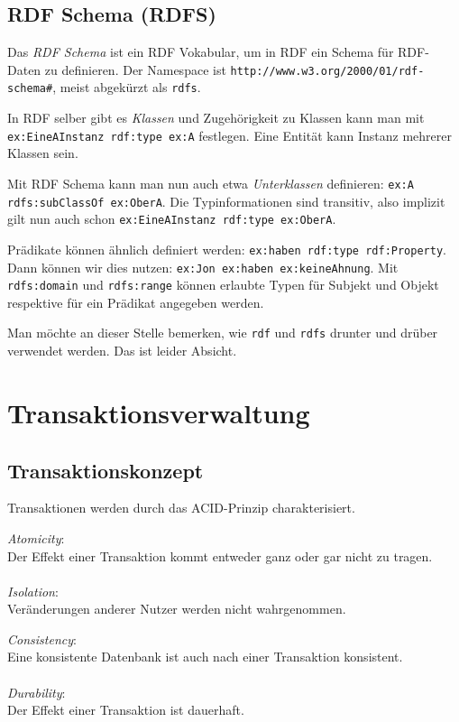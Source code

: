 \documentclass[a4paper,parskip=half*,DIV=15,fontsize=11pt]{scrartcl}
\begin{document}
\subsection{RDF Schema (RDFS)}

Das \emph{RDF Schema} ist ein RDF Vokabular, um in RDF ein Schema für RDF-Daten zu definieren. Der Namespace ist \lstinline{http://www.w3.org/2000/01/rdf-schema#}, meist abgekürzt als \lstinline{rdfs}.

In RDF selber gibt es \emph{Klassen} und Zugehörigkeit zu Klassen kann man mit \lstinline{ex:EineAInstanz rdf:type ex:A} festlegen. Eine Entität kann Instanz mehrerer Klassen sein.

Mit RDF Schema kann man nun auch etwa \emph{Unterklassen} definieren: \lstinline{ex:A rdfs:subClassOf ex:OberA}. Die Typinformationen sind transitiv, also implizit gilt nun auch schon \lstinline{ex:EineAInstanz rdf:type ex:OberA}.

Prädikate können ähnlich definiert werden: \lstinline{ex:haben rdf:type rdf:Property}. Dann können wir dies nutzen: \lstinline{ex:Jon ex:haben ex:keineAhnung}. Mit \lstinline{rdfs:domain} und \lstinline{rdfs:range} können erlaubte Typen für Subjekt und Objekt respektive für ein Prädikat angegeben werden.

Man möchte an dieser Stelle bemerken, wie \lstinline{rdf} und \lstinline{rdfs} drunter und drüber verwendet werden. Das ist leider Absicht.
\pagebreak
\section{Transaktionsverwaltung}
\subsection{Transaktionskonzept}
Transaktionen werden durch das ACID-Prinzip  charakterisiert.

\begin{minipage}[t]{0.45\textwidth}
\emph{Atomicity}: \\
Der Effekt einer Transaktion kommt entweder ganz oder gar nicht zu tragen.\\
\ \\
\emph{Isolation}: \\
Veränderungen anderer Nutzer werden nicht wahrgenommen.
\end{minipage}
\hspace{0.10\textwidth}
\begin{minipage}[t]{0.45\textwidth}
\emph{Consistency}: \\
Eine konsistente Datenbank ist auch nach einer Transaktion konsistent. \\
\ \\
\emph{Durability}: \\
Der Effekt einer Transaktion ist dauerhaft.
\end{minipage} \\
\medskip
\end{document}
